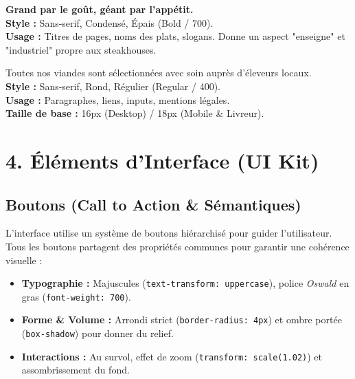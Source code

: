 \documentclass[12pt,a4paper]{article}
\begin{document}
\begin{tcolorbox}[colback=SauceCream, colframe=CoalBlack!20, arc=2mm, title=\color{CoalBlack}\textbf{Titres (H1, H2, H3) : OSWALD}, fonttitle=\small, drop fuzzy shadow]
    {\Large\bfseries Grand par le goût, géant par l'appétit.} \\
    \vspace{0.1cm}
    \small \textbf{Style :} Sans-serif, Condensé, Épais (Bold / 700). \\
    \textbf{Usage :} Titres de pages, noms des plats, slogans. Donne un aspect "enseigne" et "industriel" propre aux steakhouses.
\end{tcolorbox}

\begin{tcolorbox}[colback=white, colframe=CoalBlack!20, arc=2mm, title=\color{CoalBlack}\textbf{Corps de Texte : LATO} (Fallback : Roboto), fonttitle=\small, drop fuzzy shadow]
    {\large Toutes nos viandes sont sélectionnées avec soin auprès d'éleveurs locaux.} \\
    \vspace{0.1cm}
    \small \textbf{Style :} Sans-serif, Rond, Régulier (Regular / 400). \\
    \textbf{Usage :} Paragraphes, liens, inputs, mentions légales. \\
    \textbf{Taille de base :} 16px (Desktop) / 18px (Mobile \& Livreur).
\end{tcolorbox}

\section{4. Éléments d'Interface (UI Kit)}

\subsection{Boutons (Call to Action \& Sémantiques)}
L'interface utilise un système de boutons hiérarchisé pour guider l'utilisateur. Tous les boutons partagent des propriétés communes pour garantir une cohérence visuelle :
\begin{itemize}[label=\textcolor{CoalBlack}{\tiny\faCircle}, itemsep=0pt]
    \item \textbf{Typographie :} Majuscules (\texttt{text-transform: uppercase}), police \textit{Oswald} en gras (\texttt{font-weight: 700}).
    \item \textbf{Forme \& Volume :} Arrondi strict (\texttt{border-radius: 4px}) et ombre portée (\texttt{box-shadow}) pour donner du relief.
    \item \textbf{Interactions :} Au survol, effet de zoom (\texttt{transform: scale(1.02)}) et assombrissement du fond.
\end{itemize}
\end{document}
